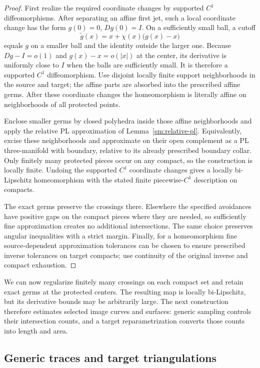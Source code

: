 \documentclass[11pt]{article}
\numberwithin{equation}{section}
\theoremstyle{definition}
\theoremstyle{remark}
\begin{document}
\begin{proof}
First realize the required coordinate changes by supported $C^1$
diffeomorphisms.  After separating an affine first jet, such a local
coordinate change has the form $g(0)=0$, $Dg(0)=I$.  On a sufficiently
small ball, a cutoff
\[
 \widetilde g(x)=x+\chi(x)\bigl(g(x)-x\bigr)
\]
equals $g$ on a smaller ball and the identity outside the larger one.
Because $Dg-I=o(1)$ and $g(x)-x=o(|x|)$ at the center, its derivative
is uniformly close to $I$ when the balls are sufficiently small.
It is therefore a supported $C^1$ diffeomorphism.  Use disjoint
locally finite support neighborhoods in the source and target;
the affine parts are absorbed into the prescribed affine germs.
After these coordinate changes the homeomorphism is literally
affine on neighborhoods of all protected points.

Enclose smaller germs by closed polyhedra inside those affine
neighborhoods and apply the relative PL approximation of
Lemma~\ref{sm:relative-pl}.  Equivalently, excise these neighborhoods
and approximate on their open complement as a PL three-manifold
with boundary, relative to its already prescribed boundary collar.
Only finitely many protected pieces occur on any compact, so the
construction is locally finite.  Undoing the supported $C^1$
coordinate changes gives a locally bi-Lipschitz homeomorphism
with the stated finite piecewise-$C^1$ description on compacts.

The exact germs preserve the crossings there.  Elsewhere the
specified avoidances have positive gaps on the compact pieces
where they are needed, so sufficiently fine approximation creates
no additional intersections.  The same choice preserves angular
inequalities with a strict margin.  Finally, for a homeomorphism
fine source-dependent approximation tolerances can be chosen to
ensure prescribed inverse tolerances on target compacts; use
continuity of the original inverse and compact exhaustion.
\end{proof}


We can now regularize finitely many crossings on each compact set
and retain exact germs at the protected centers. The resulting map
is locally bi-Lipschitz, but its derivative bounds may be arbitrarily
large. The next construction therefore estimates selected image
curves and surfaces: generic sampling controls their intersection
counts, and a target reparametrization converts those counts into
length and area.

\subsection{Generic traces and target triangulations}
\end{document}
